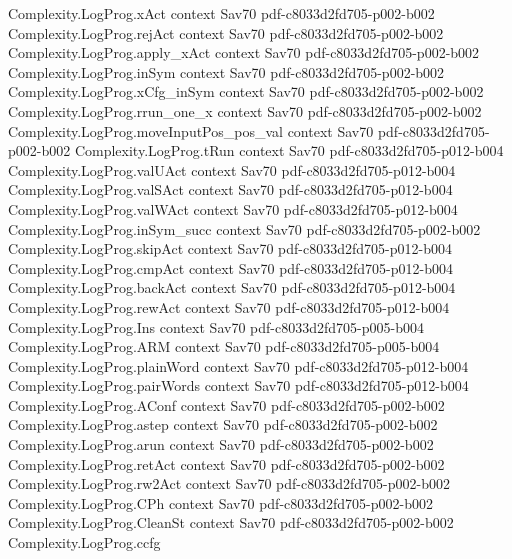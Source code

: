 \begin{theorem}
\proofstep
  {Complexity.LogProg.xAct}
  {context}
  {Sav70}
  {pdf-c8033d2fd705-p002-b002}
\proofstep
  {Complexity.LogProg.rejAct}
  {context}
  {Sav70}
  {pdf-c8033d2fd705-p002-b002}
\proofstep
  {Complexity.LogProg.apply_xAct}
  {context}
  {Sav70}
  {pdf-c8033d2fd705-p002-b002}
\proofstep
  {Complexity.LogProg.inSym}
  {context}
  {Sav70}
  {pdf-c8033d2fd705-p002-b002}
\proofstep
  {Complexity.LogProg.xCfg_inSym}
  {context}
  {Sav70}
  {pdf-c8033d2fd705-p002-b002}
\proofstep
  {Complexity.LogProg.rrun_one_x}
  {context}
  {Sav70}
  {pdf-c8033d2fd705-p002-b002}
\proofstep
  {Complexity.LogProg.moveInputPos_pos_val}
  {context}
  {Sav70}
  {pdf-c8033d2fd705-p002-b002}
\proofstep
  {Complexity.LogProg.tRun}
  {context}
  {Sav70}
  {pdf-c8033d2fd705-p012-b004}
\proofstep
  {Complexity.LogProg.valUAct}
  {context}
  {Sav70}
  {pdf-c8033d2fd705-p012-b004}
\proofstep
  {Complexity.LogProg.valSAct}
  {context}
  {Sav70}
  {pdf-c8033d2fd705-p012-b004}
\proofstep
  {Complexity.LogProg.valWAct}
  {context}
  {Sav70}
  {pdf-c8033d2fd705-p012-b004}
\proofstep
  {Complexity.LogProg.inSym_succ}
  {context}
  {Sav70}
  {pdf-c8033d2fd705-p002-b002}
\proofstep
  {Complexity.LogProg.skipAct}
  {context}
  {Sav70}
  {pdf-c8033d2fd705-p012-b004}
\proofstep
  {Complexity.LogProg.cmpAct}
  {context}
  {Sav70}
  {pdf-c8033d2fd705-p012-b004}
\proofstep
  {Complexity.LogProg.backAct}
  {context}
  {Sav70}
  {pdf-c8033d2fd705-p012-b004}
\proofstep
  {Complexity.LogProg.rewAct}
  {context}
  {Sav70}
  {pdf-c8033d2fd705-p012-b004}
\proofstep
  {Complexity.LogProg.Ins}
  {context}
  {Sav70}
  {pdf-c8033d2fd705-p005-b004}
\proofstep
  {Complexity.LogProg.ARM}
  {context}
  {Sav70}
  {pdf-c8033d2fd705-p005-b004}
\proofstep
  {Complexity.LogProg.plainWord}
  {context}
  {Sav70}
  {pdf-c8033d2fd705-p012-b004}
\proofstep
  {Complexity.LogProg.pairWords}
  {context}
  {Sav70}
  {pdf-c8033d2fd705-p012-b004}
\proofstep
  {Complexity.LogProg.AConf}
  {context}
  {Sav70}
  {pdf-c8033d2fd705-p002-b002}
\proofstep
  {Complexity.LogProg.astep}
  {context}
  {Sav70}
  {pdf-c8033d2fd705-p002-b002}
\proofstep
  {Complexity.LogProg.arun}
  {context}
  {Sav70}
  {pdf-c8033d2fd705-p002-b002}
\proofstep
  {Complexity.LogProg.retAct}
  {context}
  {Sav70}
  {pdf-c8033d2fd705-p002-b002}
\proofstep
  {Complexity.LogProg.rw2Act}
  {context}
  {Sav70}
  {pdf-c8033d2fd705-p002-b002}
\proofstep
  {Complexity.LogProg.CPh}
  {context}
  {Sav70}
  {pdf-c8033d2fd705-p002-b002}
\proofstep
  {Complexity.LogProg.CleanSt}
  {context}
  {Sav70}
  {pdf-c8033d2fd705-p002-b002}
\proofstep
  {Complexity.LogProg.ccfg}

\end{theorem}
